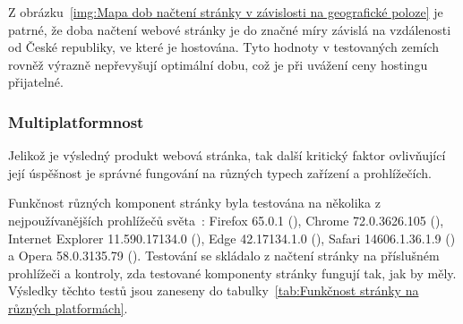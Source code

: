 \documentclass[a4paper, 12pt, twoside]{article}
\begin{document}
  Z obrázku~\ref{img:Mapa dob načtení stránky v závislosti na geografické poloze} je patrné, že doba načtení webové stránky je do značné míry závislá na vzdálenosti od České republiky, ve které je hostována. Tyto hodnoty v testovaných zemích rovněž výrazně nepřevyšují optimální dobu, což je při uvážení ceny hostingu přijatelné.


  \subsubsection{Multiplatformnost}
  Jelikož je výsledný produkt webová stránka, tak další kritický faktor ovlivňující její úspěšnost je správné fungování na různých typech zařízení a prohlížečích.

  Funkčnost různých komponent stránky byla testována na několika z nejpoužívanějších prohlížečů světa~\cite{browser-statistics}: Firefox 65.0.1 (), Chrome 72.0.3626.105 (), Internet Explorer 11.590.17134.0 (), Edge 42.17134.1.0 (), Safari 14606.1.36.1.9 () a Opera 58.0.3135.79 (). Testování se skládalo z načtení stránky na příslušném prohlížeči a kontroly, zda testované komponenty stránky fungují tak, jak by měly. Výsledky těchto testů jsou zaneseny do tabulky~\ref{tab:Funkčnost stránky na různých platformách}.
\end{document}
